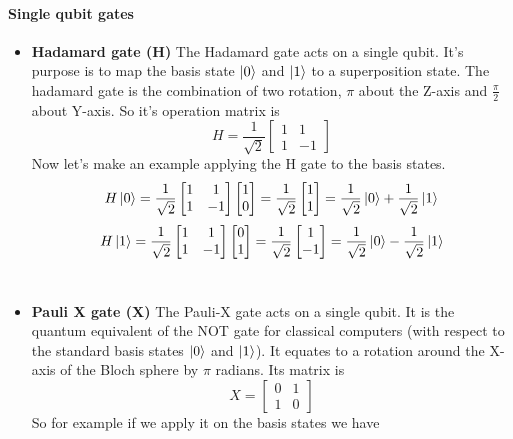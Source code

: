 \documentclass[main.tex]{subfiles}
\theoremstyle{definition}
\begin{document}
	\paragraph{Single qubit gates}
	\begin{itemize}
	\item \textbf{Hadamard gate (H)} The Hadamard gate acts on a single qubit. It's purpose is to map the
	basis state $\ket{0}$  and $\ket{1}$ to a superposition state.
	The hadamard gate is the combination of two rotation, $\pi$ about the Z-axis and 
	$\frac{\pi}{2}$ about Y-axis. 
	So it's operation matrix is
	\begin{equation}
	H=\frac{1}{\sqrt{2}}
	\begin{bmatrix}
	1 & 1\\
	1 & -1
	\end{bmatrix}
	\end{equation}
	Now let's make an example applying the H gate to the basis states.
	\begin{equation}
	H\ket{0}=\frac{1}{\sqrt{2}}
	\begin{bmatrix}
	1 & 1\\
	1 & -1
	\end{bmatrix}
	\begin{bmatrix}
	1 \\
	0
	\end{bmatrix}
	=\frac{1}{\sqrt{2}}
	\begin{bmatrix}
	1 \\
	1
	\end{bmatrix}
	=
	\frac{1}{\sqrt{2}}\ket{0}+\frac{1}{\sqrt{2}}\ket{1}
	\end{equation}
	\begin{equation}
	H\ket{1}=\frac{1}{\sqrt{2}}
	\begin{bmatrix}
	1 & 1\\
	1 & -1
	\end{bmatrix}
	\begin{bmatrix}
	0 \\
	1
	\end{bmatrix}
	=\frac{1}{\sqrt{2}}
	\begin{bmatrix}
	1 \\
	-1
	\end{bmatrix}
	=
	\frac{1}{\sqrt{2}}\ket{0}-\frac{1}{\sqrt{2}}\ket{1}
	\end{equation}\\
	
	\item \textbf{Pauli X gate (X)} The Pauli-X gate acts on a single qubit. It is the quantum equivalent of the NOT gate for classical 
	computers (with respect to the standard basis states $\ket{0}$ and $\ket{1}$).  It equates to a rotation around the X-axis of the
	Bloch sphere by $\pi$ radians. Its matrix is 
	\begin{equation}
	X=
	\begin{bmatrix}
	0 & 1\\
	1 & 0
	\end{bmatrix}
	\end{equation}
	So for example if we apply it on the basis states we have
	

\end{itemize}
\end{document}
